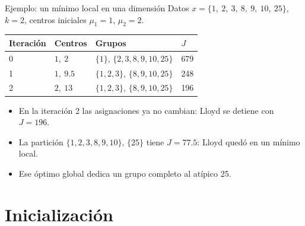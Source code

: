 \documentclass[aspectratio=169,11pt]{beamer}
\begin{document}
\begin{frame}{Ejemplo: un mínimo local en una dimensión}
  Datos $x = \{1,\ 2,\ 3,\ 8,\ 9,\ 10,\ 25\}$, $k=2$, centros iniciales $\mu_1 = 1$, $\mu_2 = 2$.
  \vspace{4pt}
  \begin{center}
    \renewcommand{\arraystretch}{1.2}
    \begin{tabular}{@{}llll@{}}
      \toprule
      \textbf{Iteración} & \textbf{Centros} & \textbf{Grupos} & $J$\\
      \midrule
      0 & $1,\ 2$ & $\{1\}$, $\{2,3,8,9,10,25\}$ & 679 \\
      1 & $1,\ 9.5$ & $\{1,2,3\}$, $\{8,9,10,25\}$ & 248 \\
      2 & $2,\ 13$ & $\{1,2,3\}$, $\{8,9,10,25\}$ & 196 \\
      \bottomrule
    \end{tabular}
  \end{center}
  \begin{itemize}
    \item En la iteración 2 las asignaciones ya no cambian: Lloyd se detiene con $J = 196$.
    \item La partición $\{1,2,3,8,9,10\}$, $\{25\}$ tiene $J = 77.5$: Lloyd quedó en un \alert{mínimo local}.
    \item Ese óptimo global dedica un grupo completo al \alert{atípico} 25.
  \end{itemize}
\end{frame}

\section{Inicialización}
\end{document}
